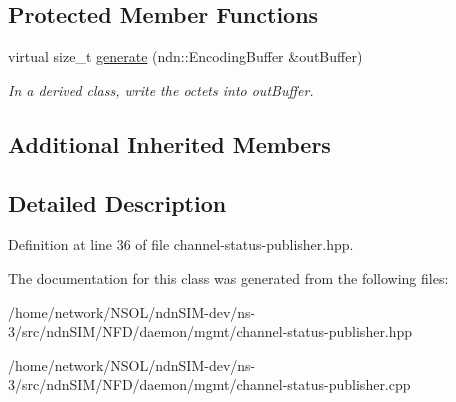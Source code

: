 \subsection*{Protected Member Functions}
\begin{DoxyCompactItemize}
\item 
virtual size\+\_\+t \hyperlink{classnfd_1_1ChannelStatusPublisher_a8e3fe110e9b6ed2842ea8d3dcb6458c0}{generate} (ndn\+::\+Encoding\+Buffer \&out\+Buffer)\hypertarget{classnfd_1_1ChannelStatusPublisher_a8e3fe110e9b6ed2842ea8d3dcb6458c0}{}\label{classnfd_1_1ChannelStatusPublisher_a8e3fe110e9b6ed2842ea8d3dcb6458c0}

\begin{DoxyCompactList}\small\item\em In a derived class, write the octets into out\+Buffer. \end{DoxyCompactList}\end{DoxyCompactItemize}
\subsection*{Additional Inherited Members}


\subsection{Detailed Description}


Definition at line 36 of file channel-\/status-\/publisher.\+hpp.



The documentation for this class was generated from the following files\+:\begin{DoxyCompactItemize}
\item 
/home/network/\+N\+S\+O\+L/ndn\+S\+I\+M-\/dev/ns-\/3/src/ndn\+S\+I\+M/\+N\+F\+D/daemon/mgmt/channel-\/status-\/publisher.\+hpp\item 
/home/network/\+N\+S\+O\+L/ndn\+S\+I\+M-\/dev/ns-\/3/src/ndn\+S\+I\+M/\+N\+F\+D/daemon/mgmt/channel-\/status-\/publisher.\+cpp\end{DoxyCompactItemize}
